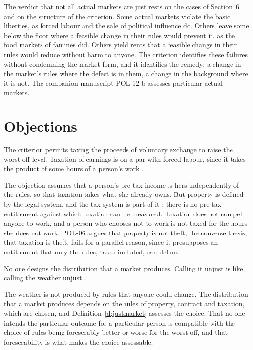 \documentclass{situationist-preprint}
\begin{document}
The verdict that not all actual markets are just rests on the cases of Section~6 and on the structure of the criterion. Some actual markets violate the basic liberties, as forced labour and the sale of political influence do. Others leave some below the floor where a feasible change in their rules would prevent it, as the food markets of famines did. Others yield rents that a feasible change in their rules would reduce without harm to anyone. The criterion identifies these failures without condemning the market form, and it identifies the remedy: a change in the market's rules where the defect is in them, a change in the background where it is not. The companion manuscript POL-12-b assesses particular actual markets.

\section{Objections}

\begin{objection}
The criterion permits taxing the proceeds of voluntary exchange to raise the worst-off level. Taxation of earnings is on a par with forced labour, since it takes the product of some hours of a person's work \citep[ch.~7]{Nozick1974}.
\end{objection}

\begin{reply}
The objection assumes that a person's pre-tax income is hers independently of the rules, so that taxation takes what she already owns. But property is defined by the legal system, and the tax system is part of it \citep{MurphyNagel2002}; there is no pre-tax entitlement against which taxation can be measured. Taxation does not compel anyone to work, and a person who chooses not to work is not taxed for the hours she does not work. POL-06 argues that property is not theft; the converse thesis, that taxation is theft, fails for a parallel reason, since it presupposes an entitlement that only the rules, taxes included, can define.
\end{reply}

\begin{objection}
No one designs the distribution that a market produces. Calling it unjust is like calling the weather unjust \citep{Hayek1976}.
\end{objection}

\begin{reply}
The weather is not produced by rules that anyone could change. The distribution that a market produces depends on the rules of property, contract and taxation, which are chosen, and Definition~\ref{d:justmarket} assesses the choice. That no one intends the particular outcome for a particular person is compatible with the choice of rules being foreseeably better or worse for the worst off, and that foreseeability is what makes the choice assessable.
\end{reply}
\end{document}
